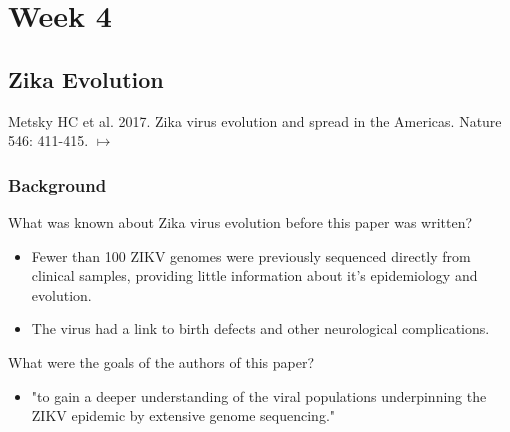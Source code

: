 \documentclass[12pt,a4paper]{article}
\begin{document}
\tableofcontents
\cleardoublepage
\fancyhead{}



\clearpage
\section*{Week 4}
{}

\subsection{Zika Evolution}
{\color{darklc} Metsky HC et al. 2017. Zika virus evolution and spread in the Americas. Nature 546: 411-415. $\mapsto$}
\subsubsection{Background}
\begin{itemize}
    {\color{G-Moon}\item What was known about Zika virus evolution before this paper was written?}
        \begin{itemize}
            \item Fewer than 100 ZIKV genomes were previously sequenced directly from clinical samples, providing little information about it's epidemiology and evolution.
            \item The virus had a link to birth defects and other neurological complications.
        \end{itemize}
    {\color{G-Moon}\item What were the goals of the authors of this paper?}
        \begin{itemize}
            \item "to gain a deeper understanding of the viral populations underpinning the ZIKV epidemic by extensive genome sequencing."
        \end{itemize}
\end{itemize}
\end{document}
